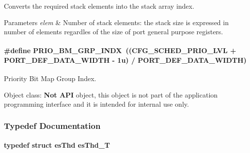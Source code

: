 Converts the required stack elements into the stack array index. 


\begin{DoxyParams}{Parameters}
{\em elem} & Number of stack elements\-: the stack size is expressed in number of elements regardles of the size of port general purpose registers. \\
\hline
\end{DoxyParams}
\hypertarget{group__kern__intf_ga28fb55234bec595dbeb2c264ac084cc1}{
\paragraph[{P\-R\-I\-O\-\_\-\-B\-M\-\_\-\-G\-R\-P\-\_\-\-I\-N\-D\-X}]{\setlength{\rightskip}{0pt plus 5cm}\#define P\-R\-I\-O\-\_\-\-B\-M\-\_\-\-G\-R\-P\-\_\-\-I\-N\-D\-X~(({\bf C\-F\-G\-\_\-\-S\-C\-H\-E\-D\-\_\-\-P\-R\-I\-O\-\_\-\-L\-V\-L} + P\-O\-R\-T\-\_\-\-D\-E\-F\-\_\-\-D\-A\-T\-A\-\_\-\-W\-I\-D\-T\-H -\/ 1u) / P\-O\-R\-T\-\_\-\-D\-E\-F\-\_\-\-D\-A\-T\-A\-\_\-\-W\-I\-D\-T\-H)}}\label{group__kern__intf_ga28fb55234bec595dbeb2c264ac084cc1}


Priority Bit Map Group Index. 

\begin{DoxyParagraph}{Object class\-:}
{\bfseries Not A\-P\-I} object, this object is not part of the application programming interface and it is intended for internal use only. 
\end{DoxyParagraph}


\subsubsection{Typedef Documentation}
\hypertarget{group__kern__intf_ga62e3a3ca0a4597a19c43cb8868810d82}{
\paragraph[{es\-Thd\-\_\-\-T}]{\setlength{\rightskip}{0pt plus 5cm}typedef struct {\bf es\-Thd} {\bf es\-Thd\-\_\-\-T}}}\label{group__kern__intf_ga62e3a3ca0a4597a19c43cb8868810d82}


